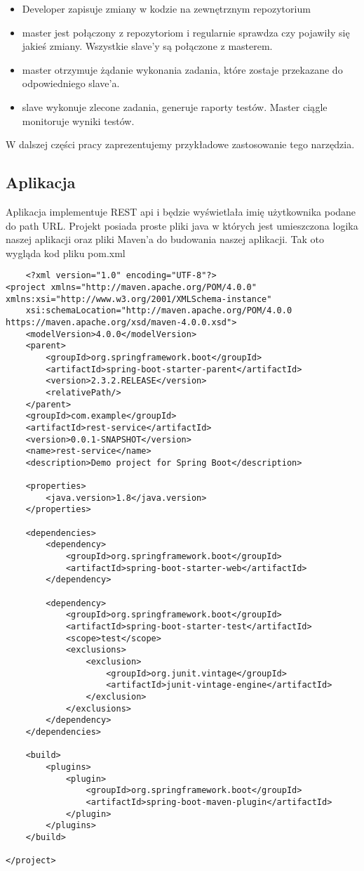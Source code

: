 \begin{itemize}
    \item Developer zapisuje zmiany w kodzie na zewnętrznym repozytorium
    \item master jest połączony z repozytoriom i regularnie sprawdza czy pojawiły się jakieś zmiany. Wszystkie slave'y są połączone z masterem.
    \item master otrzymuje żądanie wykonania zadania, które zostaje przekazane do odpowiedniego slave'a. 
    \item slave wykonuje zlecone zadania, generuje raporty testów. Master ciągle monitoruje wyniki testów.
\end{itemize}

W dalszej części pracy zaprezentujemy przykładowe zastosowanie tego narzędzia. 

\subsection{Aplikacja}

Aplikacja implementuje REST api i będzie wyświetlała imię użytkownika podane do path URL. Projekt posiada proste pliki java w których jest umieszczona logika naszej aplikacji oraz pliki Maven'a do budowania naszej aplikacji. Tak oto wygląda kod pliku pom.xml 

\begin{lstlisting}
    <?xml version="1.0" encoding="UTF-8"?>
<project xmlns="http://maven.apache.org/POM/4.0.0" xmlns:xsi="http://www.w3.org/2001/XMLSchema-instance"
	xsi:schemaLocation="http://maven.apache.org/POM/4.0.0 https://maven.apache.org/xsd/maven-4.0.0.xsd">
	<modelVersion>4.0.0</modelVersion>
	<parent>
		<groupId>org.springframework.boot</groupId>
		<artifactId>spring-boot-starter-parent</artifactId>
		<version>2.3.2.RELEASE</version>
		<relativePath/>
	</parent>
	<groupId>com.example</groupId>
	<artifactId>rest-service</artifactId>
	<version>0.0.1-SNAPSHOT</version>
	<name>rest-service</name>
	<description>Demo project for Spring Boot</description>

	<properties>
		<java.version>1.8</java.version>
	</properties>

	<dependencies>
		<dependency>
			<groupId>org.springframework.boot</groupId>
			<artifactId>spring-boot-starter-web</artifactId>
		</dependency>

		<dependency>
			<groupId>org.springframework.boot</groupId>
			<artifactId>spring-boot-starter-test</artifactId>
			<scope>test</scope>
			<exclusions>
				<exclusion>
					<groupId>org.junit.vintage</groupId>
					<artifactId>junit-vintage-engine</artifactId>
				</exclusion>
			</exclusions>
		</dependency>
	</dependencies>

	<build>
		<plugins>
			<plugin>
				<groupId>org.springframework.boot</groupId>
				<artifactId>spring-boot-maven-plugin</artifactId>
			</plugin>
		</plugins>
	</build>

</project>

\end{lstlisting}

